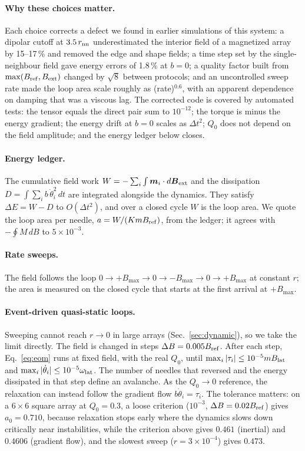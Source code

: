 \documentclass[pre,twocolumn,superscriptaddress,showpacs,floatfix]{revtex4-2}
\newcommand{\vect}[1]{\boldsymbol{#1}}
\newcommand{\Bref}{B_{\rm ref}}
\newcommand{\Blat}{B_{\rm lat}}
\begin{document}
\paragraph{Why these choices matter.} Each choice corrects a defect we found in earlier simulations of this system: a dipolar cutoff at $3.5\,r_{\rm nn}$ underestimated the interior field of a magnetized array by 15--17\,\% and removed the edge and shape fields; a time step set by the single-neighbour field gave energy errors of 1.8\,\% at $b=0$; a quality factor built from $\max(\Bref,B_{\rm ext})$ changed by $\sqrt8$ between protocols; and an uncontrolled sweep rate made the loop area scale roughly as (rate)$^{0.6}$, with an apparent dependence on damping that was a viscous lag. The corrected code is covered by automated tests: the tensor equals the direct pair sum to $10^{-12}$; the torque is minus the energy gradient; the energy drift at $b=0$ scales as $\Delta t^2$; $Q_0$ does not depend on the field amplitude; and the energy ledger below closes.

\paragraph{Energy ledger.} The cumulative field work $W=-\sum_i\int\vect m_i\cdot d\vect B_{\rm ext}$ and the dissipation $D=\int\sum_ib\,\dot\theta_i^2\,dt$ are integrated alongside the dynamics. They satisfy $\Delta E=W-D$ to $O(\Delta t^2)$, and over a closed cycle $W$ is the loop area. We quote the loop area per needle, $a=W/(Km\Bref)$, from the ledger; it agrees with $-\oint M\,dB$ to $5\times10^{-3}$.

\paragraph{Rate sweeps.} The field follows the loop $0\to+B_{\max}\to0\to-B_{\max}\to0\to+B_{\max}$ at constant $r$; the area is measured on the closed cycle that starts at the first arrival at $+B_{\max}$.

\paragraph{Event-driven quasi-static loops.} Sweeping cannot reach $r\to0$ in large arrays (Sec.~\ref{sec:dynamic}), so we take the limit directly. The field is changed in steps $\Delta B=0.005\Bref$. After each step, Eq.~\eqref{eq:eom} runs at fixed field, with the real $Q_0$, until $\max_i|\tau_i|\le10^{-5}m\Blat$ and $\max_i|\dot\theta_i|\le10^{-5}\omega_{\rm lat}$. The number of needles that reversed and the energy dissipated in that step define an avalanche. As the $Q_0\to0$ reference, the relaxation can instead follow the gradient flow $b\dot\theta_i=\tau_i$. The tolerance matters: on a $6\times6$ square array at $Q_0=0.3$, a loose criterion ($10^{-3}$, $\Delta B=0.02\Bref$) gives $a_0=0.710$, because relaxation stops early where the dynamics slows down critically near instabilities, while the criterion above gives $0.461$ (inertial) and $0.4606$ (gradient flow), and the slowest sweep ($r=3\times10^{-4}$) gives $0.473$.
\end{document}
